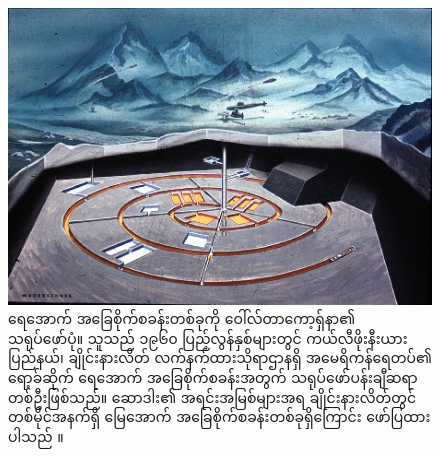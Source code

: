 \documentclass[10pt,twocolumn,letterpaper]{article}
\begin{document}
\begin{figure}[t]
\begin{center}
   \includegraphics[width=1\linewidth]{undersea.jpg}
\end{center}
   \caption{ရေအောက် အခြေစိုက်စခန်းတစ်ခုကို ဝေါ်လ်တာကော့ရှ်နာ၏ သရုပ်ဖော်ပုံ။ သူသည် ၁၉၆၀ ပြည့်လွန်နှစ်များတွင် ကယ်လီဖိုးနီးယားပြည်နယ်၊ ချိုင်းနားလိတ် လက်နက်ထားသိုရာဌာနရှိ အမေရိကန်ရေတပ်၏ ရော့ခ်ဆိုက် ရေအောက် အခြေစိုက်စခန်းအတွက် သရုပ်ဖော်ပန်းချီဆရာတစ်ဦးဖြစ်သည်။ ဆောဒါး၏ အရင်းအမြစ်များအရ ချိုင်းနားလိတ်တွင် တစ်မိုင်အနက်ရှိ မြေအောက် အခြေစိုက်စခန်းတစ်ခုရှိကြောင်း ဖော်ပြထားပါသည် \cite{22,23}။}
\label{fig:5}
\label{fig:onecol}
\end{figure}
\end{document}
